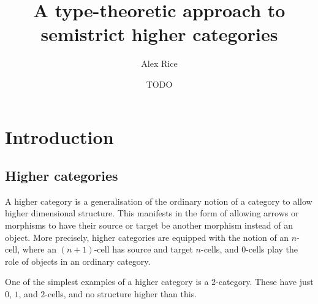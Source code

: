 \documentclass{cam-thesis}
\title{A type-theoretic approach to semistrict higher categories}
\author{Alex Rice}
\date{TODO}
\begin{document}
\frontmatter{}



\chapter{Introduction}

\section{Higher categories}
\label{sec:higher-categories}

A higher category is a generalisation of the ordinary notion of a category to allow higher dimensional structure. This manifests in the form of allowing arrows or morphisms to have their source or target be another morphism instead of an object. More precisely, higher categories are equipped with the notion of an \(n\)-cell, where an \((n+1)\)-cell has source and target \(n\)-cells, and \(0\)-cells play the role of objects in an ordinary category.

One of the simplest examples of a higher category is a 2-category. These have just \(0\), \(1\), and \(2\)-cells, and no structure higher than this.
\end{document}
